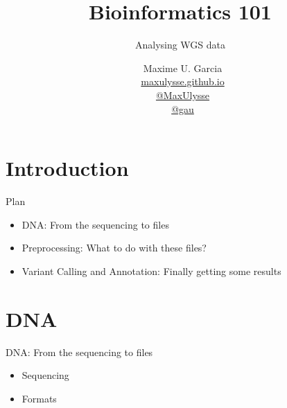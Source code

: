 \documentclass[usepdftitle=false]{beamer}
\title{%
	\vspace{-1cm}
	Bioinformatics 101
}
\subtitle{%
	Analysing WGS data
}
\author{
	\vspace{-.6cm}
	\faUser\ Maxime U. Garcia\\
	\faGlobe\ \href{https://maxulysse.github.io/}{maxulysse.github.io}\\
	\faGithub\ \href{https://github.com/MaxUlysse/}{@MaxUlysse}\\
	\faTwitter\ \href{https://twitter.com/gau/}{@gau}\\
}
\date{\vfill}
\begin{document}
{
	\maketitle
}

\section{Introduction}

\begin{frame}{Plan}
	\begin{itemize}
		\item DNA: From the sequencing to files
		\pause
		\item Preprocessing: What to do with these files?
		\pause
		\item Variant Calling and Annotation: Finally getting some results
	\end{itemize}
\end{frame}

\section{DNA}

\begin{frame}{DNA: From the sequencing to files}
	\center \Huge \faDna
	\normalsize
	\pause
	\begin{itemize}
		\item Sequencing
		\item Formats
	\end{itemize}
\end{frame}
\end{document}
